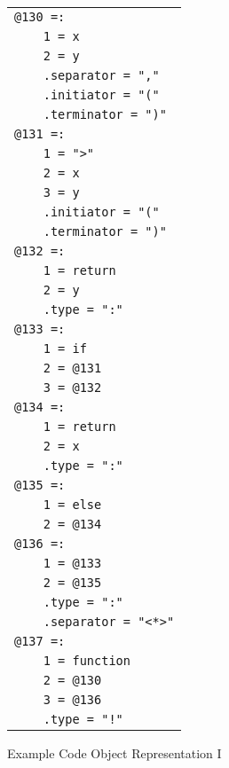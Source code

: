 \documentclass[12pt]{article}
\newlength{\figurewidth}
\newenvironment{boxedfigure}[1][!btp]%
	{\begin{figure*}[#1]
	 \begin{lrbox}{\figurebox}
	 \begin{minipage}{\figurewidth}

	 \vspace*{1ex}}%
	{
	 \vspace*{1ex}

	 \end{minipage}
	 \end{lrbox}
	 \begin{center}
	 \fbox{\hspace*{0.1in}\usebox{\figurebox}\hspace*{0.1in}}
	 \end{center}
	 \end{figure*}}
\begin{document}
\begin{boxedfigure}
\small

\begin{center}
\begin{tabular}[t]{@{}l@{}}
\verb/@130 =:/\\
\verb|    1 = x|\\
\verb|    2 = y|\\
\verb|    .separator = ","|\\
\verb|    .initiator = "("|\\
\verb|    .terminator = ")"|\\
\verb/@131 =:/\\
\verb|    1 = ">"|\\
\verb|    2 = x|\\
\verb|    3 = y|\\
\verb|    .initiator = "("|\\
\verb|    .terminator = ")"|\\
\verb/@132 =:/\\
\verb|    1 = return|\\
\verb|    2 = y|\\
\verb|    .type = ":"|\\
\verb/@133 =:/\\
\verb|    1 = if|\\
\verb|    2 = @131|\\
\verb|    3 = @132|\\
\verb/@134 =:/\\
\verb|    1 = return|\\
\verb|    2 = x|\\
\verb|    .type = ":"|\\
\verb/@135 =:/\\
\verb|    1 = else|\\
\verb|    2 = @134|\\
\verb/@136 =:/\\
\verb|    1 = @133|\\
\verb|    2 = @135|\\
\verb|    .type = ":"|\\
\verb|    .separator = "<*>"|\\
\verb/@137 =:/\\
\verb|    1 = function|\\
\verb|    2 = @130|\\
\verb|    3 = @136|\\
\verb|    .type = "!"|\\
\end{tabular}
\end{center}
\vspace*{-3ex}
\caption{Example Code Object Representation I}
\label{EXAMPLE-CODE-OBJECT-REPRESENTATION-1}
\end{boxedfigure}
\end{document}
